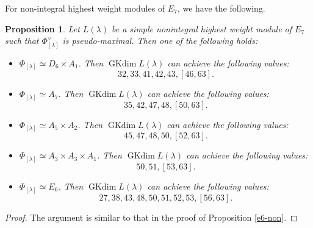 \documentclass[reqno,12pt]{amsart}
\numberwithin{equation}{section}
\theoremstyle{plain}
\newtheorem{Prop}[Thm]{Proposition}
\theoremstyle{definition}
\newcommand{\lam}{\lambda}
\newcommand{\gkd}{\operatorname{GKdim}}
\begin{document}
For non-integral highest weight modules of $E_7$, we have the following.

\begin{Prop}
Let $L(\lam)$ be a simple nonintegral highest weight module of $E_7$ such that $\Phi_{[\lam]}^\vee$ is pseudo-maximal. Then one of the following holds:
    \begin{itemize}
	\item[(1)] $\Phi_{[\lam]}\simeq D_6\times A_1$. Then 
 $ \gkd L(\lam) $ can achieve the following values:
$$32,33,41,42,43,[46,63].$$

\item[(2)]  $\Phi_{[\lam]}\simeq A_7$. Then
 $ \gkd L(\lam) $ can achieve the following values:
$$35,42,47,48,[50,63].$$


  
   
    \item[(3)] $\Phi_{[\lam]}\simeq A_5\times A_2$. 
 Then 
 $ \gkd L(\lam) $ can achieve the following values:
$$45,47,48,50,[52,63].$$ 



    \item[(4)] $\Phi_{[\lam]}\simeq A_3\times A_3\times A_1$. Then 
 $ \gkd L(\lam) $ can achieve the following values:
$$50,51,[53,63].$$








\item[(5)]  $\Phi_{[\lam]}\simeq E_6$. Then 
 $ \gkd L(\lam) $ can achieve the following values:
$$27,38,43,48,50,51,52,53,[56,63].$$



\end{itemize}
\end{Prop}

\begin{proof}
The argument is similar to that in the proof of Proposition \ref{e6-non}.


\end{proof}
\end{document}
